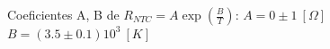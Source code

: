 
Coeficientes A, B de $R_{NTC} = A \exp(\frac{B}{T})$:
$A = 0 \pm 1\ [\Omega]$
$B = (3.5 \pm 0.1)10^3\ [K]$
